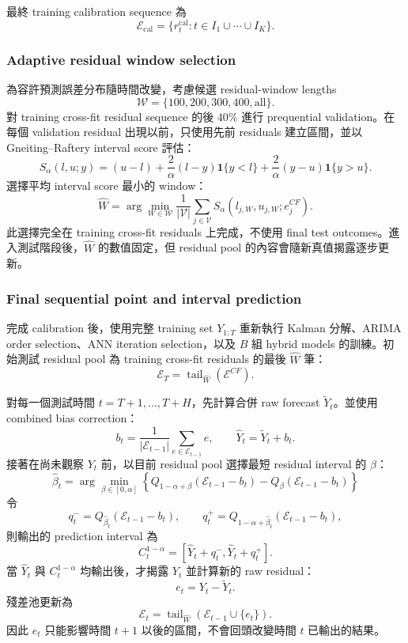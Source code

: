 最終 training calibration sequence 為
\[
    \mathcal E_{\mathrm{cal}}
    =\{r_t^{\mathrm{cal}}:t\in I_1\cup\cdots\cup I_K\}.
\]
\subsubsection{Adaptive residual window selection}

為容許預測誤差分布隨時間改變，考慮候選 residual-window lengths
\[
    \mathcal W=\{100,200,300,400,\mathrm{all}\}.
\]
對 training cross-fit residual sequence 的後 $40\%$ 進行 prequential validation。在每個 validation residual 出現以前，只使用先前 residuals 建立區間，並以 Gneiting--Raftery interval score 評估：
\[
S_{\alpha}(l,u;y)
=(u-l)
+\frac{2}{\alpha}(l-y)\mathbf 1\{y<l\}
+\frac{2}{\alpha}(y-u)\mathbf 1\{y>u\}.
\]
選擇平均 interval score 最小的 window：
\[
    \widehat W
    =\arg\min_{W\in\mathcal W}
    \frac{1}{|\mathcal V|}
    \sum_{j\in\mathcal V}S_{\alpha}(l_{j,W},u_{j,W};e_j^{CF}).
\]
此選擇完全在 training cross-fit residuals 上完成，不使用 final test outcomes。進入測試階段後，$\widehat W$ 的數值固定，但 residual pool 的內容會隨新真值揭露逐步更新。

\subsubsection{Final sequential point and interval prediction}

完成 calibration 後，使用完整 training set $Y_{1:T}$ 重新執行 Kalman 分解、ARIMA order selection、ANN iteration selection，以及 $B$ 組 hybrid models 的訓練。初始測試 residual pool 為 training cross-fit residuals 的最後 $\widehat W$ 筆：
\[
    \mathcal E_T
    =\operatorname{tail}_{\widehat W}(\mathcal E^{CF}).
\]

對每一個測試時間 $t=T+1,\ldots,T+H$，先計算合併 raw forecast $\widetilde Y_t$。並使用 combined bias correction：
\[
    b_t=\frac{1}{|\mathcal E_{t-1}|}
    \sum_{e\in\mathcal E_{t-1}}e,
    \qquad
    \widehat Y_t=\widetilde Y_t+b_t.
\]
接著在尚未觀察 $Y_t$ 前，以目前 residual pool 選擇最短 residual interval 的 $\beta$：
\[
\widehat\beta_t
=\arg\min_{\beta\in[0,\alpha]}
\left\{
Q_{1-\alpha+\beta}(\mathcal E_{t-1}-b_t)
-Q_{\beta}(\mathcal E_{t-1}-b_t)
\right\}
\]
令
\[
q_t^-=Q_{\widehat\beta_t}(\mathcal E_{t-1}-b_t),
\qquad
q_t^+=Q_{1-\alpha+\widehat\beta_t}(\mathcal E_{t-1}-b_t),
\]
則輸出的 prediction interval 為
\[
    C_t^{1-\alpha}
    =[\widehat Y_t+q_t^-,\widehat Y_t+q_t^+].
\]
當 $\widehat Y_t$ 與 $C_t^{1-\alpha}$ 均輸出後，才揭露 $Y_t$ 並計算新的 raw residual：
\[
    e_t=Y_t-\widetilde Y_t.
\]
殘差池更新為
\[
    \mathcal E_t
    =\operatorname{tail}_{\widehat W}
    \left(\mathcal E_{t-1}\cup\{e_t\}\right).
\]
因此 $e_t$ 只能影響時間 $t+1$ 以後的區間，不會回頭改變時間 $t$ 已輸出的結果。

